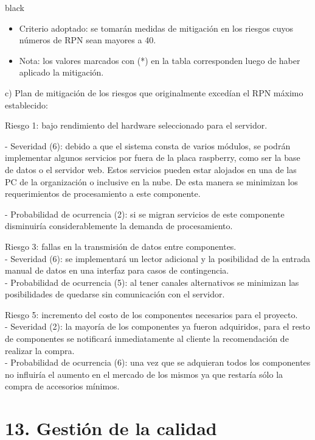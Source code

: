 \documentclass[11pt]{charter}
\begin{document}
\begin{consigna}{black}
\begin{itemize}

\item Criterio adoptado: 
se tomarán medidas de mitigación en los riesgos cuyos números de RPN sean mayores a 40.

\item Nota: los valores marcados con (*) en la tabla corresponden luego de haber aplicado la mitigación.

\end{itemize}
c) Plan de mitigación de los riesgos que originalmente excedían el RPN máximo establecido:
 

Riesgo 1: bajo rendimiento del hardware seleccionado para el servidor.

- Severidad (6): debido a que el sistema consta de varios módulos, se podrán implementar algunos servicios por fuera de la placa raspberry, como ser la base de datos o el servidor web. Estos servicios pueden estar alojados en una de las PC de la organización o inclusive en la nube. De esta manera se minimizan los requerimientos de procesamiento a este componente.

- Probabilidad de ocurrencia (2): si se migran servicios de este componente disminuiría considerablemente la demanda de procesamiento.

Riesgo 3: fallas en la transmisión de datos entre componentes.
 \\- Severidad (6): se implementará un lector adicional y la posibilidad de la entrada manual de datos en una interfaz para casos de contingencia.
 \\- Probabilidad de ocurrencia (5): al tener canales alternativos se minimizan las posibilidades de quedarse sin comunicación con el servidor.
 
Riesgo 5: incremento del costo de los componentes necesarios para el proyecto.
\\- Severidad (2): la mayoría de los componentes ya fueron adquiridos, para el resto de componentes se notificará inmediatamente al cliente la recomendación de realizar la compra.
 \\- Probabilidad de ocurrencia (6): una vez que se adquieran todos los componentes no influiría el aumento en el mercado de los mismos ya que restaría sólo la compra de accesorios mínimos.

\end{consigna}


\section{13. Gestión de la calidad}
\label{sec:calidad}
\end{document}
